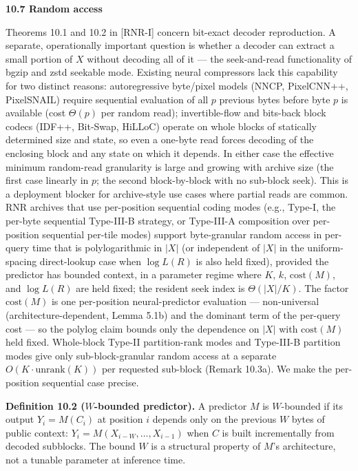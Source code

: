 \documentclass[
]{article}
\begin{document}
\textbf{10.7 Random access}

Theorems 10.1 and 10.2 in [RNR-I] concern bit-exact decoder reproduction. A
separate, operationally important question is whether a decoder can
extract a small portion of $X$ without decoding all of it --- the
seek-and-read functionality of bgzip and zstd seekable mode.
Existing neural compressors lack this capability for two distinct
reasons: autoregressive byte/pixel models (NNCP, PixelCNN++,
PixelSNAIL) require sequential evaluation of all $p$ previous bytes
before byte $p$ is available (cost $\Theta(p)$ per random read);
invertible-flow and bits-back block codecs (IDF++, Bit-Swap,
HiLLoC) operate on whole blocks of statically determined size and
state, so even a one-byte read forces decoding of the enclosing
block and any state on which it depends. In either case the
effective minimum random-read granularity is large and growing with
archive size (the first case linearly in $p$; the second
block-by-block with no sub-block seek). This is a deployment
blocker for archive-style use cases where partial reads are common.
RNR archives that use per-position sequential coding modes (e.g.,
Type-I, the per-byte sequential Type-III-B strategy, or Type-III-A
composition over per-position sequential per-tile modes) support
byte-granular random access in per-query time that is
polylogarithmic in $|X|$ (or independent of $|X|$ in the
uniform-spacing direct-lookup case when $\log L(R)$ is also
held fixed), provided the predictor has
bounded context, in a parameter regime where $K$, $k$,
$\mathrm{cost}(M)$, and $\log L(R)$ are held fixed; the resident
seek index is $\Theta(|X|/K)$. The factor $\mathrm{cost}(M)$ is one
per-position neural-predictor evaluation --- non-universal
(architecture-dependent, Lemma 5.1b) and the dominant term of the
per-query cost --- so the polylog claim bounds only the dependence on
$|X|$ with $\mathrm{cost}(M)$ held fixed. Whole-block Type-II partition-rank
modes and Type-III-B partition modes give only sub-block-granular
random access at a separate $O(K \cdot \mathrm{unrank}(K))$ per
requested sub-block (Remark 10.3a). We make the per-position
sequential case precise.

\textbf{Definition 10.2 ($W$-bounded predictor).} A predictor $M$ is
$W$-bounded if its output $Y_i = M(C_i)$ at position $i$ depends only
on the previous $W$ bytes of public context:
$Y_i = M(X_{i-W}, \ldots, X_{i-1})$ when $C$ is built incrementally
from decoded subblocks. The bound $W$ is a structural property of
$M$'s architecture, not a tunable parameter at inference time.
\end{document}
